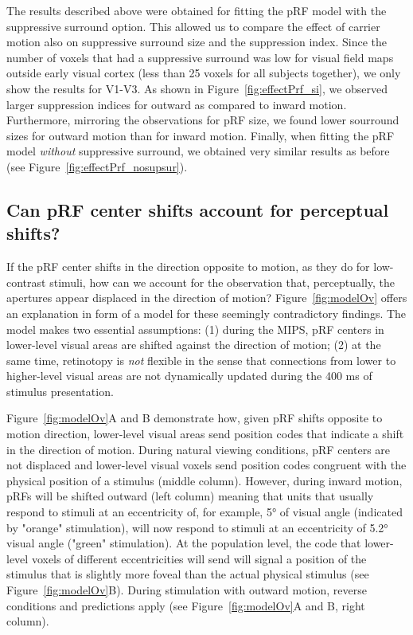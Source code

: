 The results described above were obtained for fitting the pRF model with the suppressive surround option. This allowed us to compare the effect of carrier motion also on suppressive surround size and the suppression index. Since the number of voxels that had a suppressive surround was low for visual field maps outside early visual cortex (less than 25 voxels for all subjects together), we only show the results for V1-V3. As shown in Figure~\ref{fig:effectPrf_si}, we observed larger suppression indices for outward as compared to inward motion. Furthermore, mirroring the observations for pRF size, we found lower sourround sizes for outward motion than for inward motion. Finally, when fitting the pRF model \textit{without} suppressive surround, we obtained very similar results as before (see Figure~\ref{fig:effectPrf_nosupsur}).

\subsection{Can pRF center shifts account for perceptual shifts?}
If the pRF center shifts in the direction opposite to motion, as they do for low-contrast stimuli, how can we account for the observation that, perceptually, the apertures appear displaced in the direction of motion? Figure~\ref{fig:modelOv} offers an explanation in form of a model for these seemingly contradictory findings. The model makes two essential assumptions: (1) during the MIPS, pRF centers in lower-level visual areas are shifted against the direction of motion; (2) at the same time, retinotopy is \textit{not} flexible in the sense that connections from lower to higher-level visual areas are not dynamically updated during the 400 ms of stimulus presentation.

Figure~\ref{fig:modelOv}A and B demonstrate how, given pRF shifts opposite to motion direction, lower-level visual areas send position codes that indicate a shift in the direction of motion. During natural viewing conditions, pRF centers are not displaced and lower-level visual voxels send position codes congruent with the physical position of a stimulus (middle column). However, during inward motion, pRFs will be shifted outward (left column) meaning that units that usually respond to stimuli at an eccentricity of, for example, 5° of visual angle (indicated by "orange" stimulation), will now respond to stimuli at an eccentricity of 5.2° visual angle ("green" stimulation). At the population level, the code that lower-level voxels of different eccentricities will send will signal a position of the stimulus that is slightly more foveal than the actual physical stimulus (see Figure~\ref{fig:modelOv}B). During stimulation with outward motion, reverse conditions and predictions apply (see Figure~\ref{fig:modelOv}A and B, right column).

